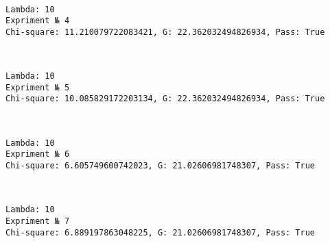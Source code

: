 \documentclass[11pt]{article}
\begin{document}
    \begin{center}
    \end{center}
    { \hspace*{\fill} \\}
    
    \begin{Verbatim}[commandchars=\\\{\}]
Lambda: 10
Expriment № 4
Chi-square: 11.210079722083421, G: 22.362032494826934, Pass: True
    \end{Verbatim}

    \begin{center}
    \end{center}
    { \hspace*{\fill} \\}
    
    \begin{Verbatim}[commandchars=\\\{\}]
Lambda: 10
Expriment № 5
Chi-square: 10.085829172203134, G: 22.362032494826934, Pass: True
    \end{Verbatim}

    \begin{center}
    \end{center}
    { \hspace*{\fill} \\}
    
    \begin{Verbatim}[commandchars=\\\{\}]
Lambda: 10
Expriment № 6
Chi-square: 6.605749600742023, G: 21.02606981748307, Pass: True
    \end{Verbatim}

    \begin{center}
    \end{center}
    { \hspace*{\fill} \\}
    
    \begin{Verbatim}[commandchars=\\\{\}]
Lambda: 10
Expriment № 7
Chi-square: 6.889197863048225, G: 21.02606981748307, Pass: True
    \end{Verbatim}
\end{document}
